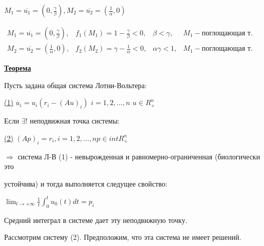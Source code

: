 \newpage
$M_1 = \overline{u_1} = (0 , \frac{\gamma}{\beta}),$\hspace{0.2cm}$M_2 = \overline{u_2} = (\frac{1}{\alpha} , 0)$

\vspace{0.5cm}
$
	\begin{matrix}
	M_1 = \overline{u_1} = (0 , \frac{\gamma}{\beta}), & f_1(M_1) = 1 - \frac{\gamma}{\beta} < 0,&\beta < \gamma,  & M_1- {\text {поглощающая т.}}\\
	M_2 = \overline{u_2} = (\frac{1}{\alpha} , 0), & f_2(M_2) = \gamma - \frac{1}{\alpha}<0,&\alpha\gamma < 1, & M_1- {\text {поглощающая т.}}
	\end{matrix}
$


\vspace{0.5cm}
\textbf{\underline{Теорема}}

Пусть задана общая система Лотни-Вольтера:

\underline{(1)} $\dot{u_i} = u_i(r_i - (Au)_i)$ \hspace{0.2cm} $i = 1,2,...,n$ \hspace{0.2cm} $u \in R_+^n$
 
Если $\exists ! $ неподвижная точка системы:

\underline{(2)} $(Ap)_i = r_i, $\hspace{0.2cm}$ i = 1,2,...,n$\hspace{0.2cm}$ p \in intR_+^n$


$\Rightarrow$ система Л-В (1) - невырожденная и равномерно-ограниченная (биологически это

устойчива) и тогда выполняется следущее свойство:

\vspace{0.2cm}
\begin{center}
\begin{Large}
$
\lim_{t \to +\infty} \frac{1}{t}\int_0^t u_0(t)dt = p_i
$
\end{Large}

\end{center}
\begin{figure} [h!]
			\caption{}	
\end{figure} 

Средний интеграл в системе дает эту неподвижную точку.

\vspace{0.5cm}
Рассмотрим систему (2). Предположим, что эта система не имеет решений.

